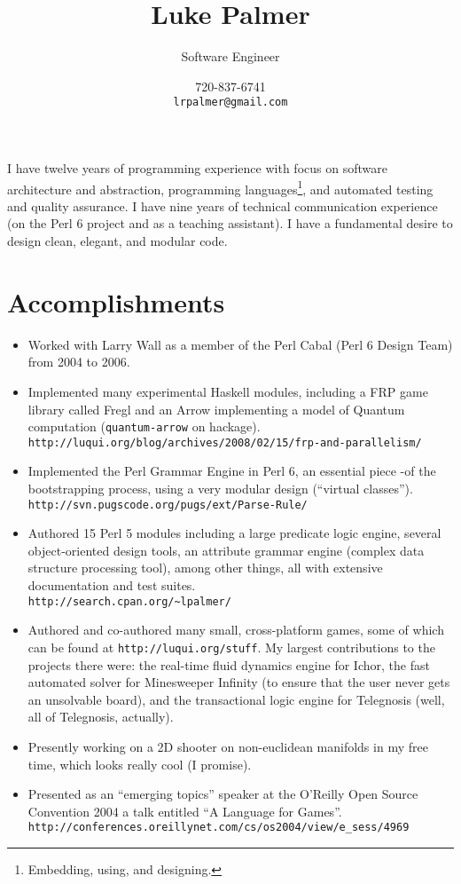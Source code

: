 \documentclass[12pt]{article}
\title{Luke Palmer}
\author{Software Engineer}
\date{720-837-6741 \\ \texttt{lrpalmer@gmail.com}}
\begin{document}
\maketitle

I have twelve years of programming experience with focus on software
architecture and abstraction, programming languages\footnote{Embedding,
using, and designing.}, and automated testing and quality assurance.  I
have nine years of technical communication experience (on the Perl 6
project and as a teaching assistant). I have a fundamental desire to
design clean, elegant, and modular code.

\section*{Accomplishments}

\begin{itemize}
\item Worked with Larry Wall as a member of the Perl Cabal (Perl 6
Design Team) from 2004 to 2006.
\item Implemented many experimental Haskell modules, including a FRP
game library called Fregl and an Arrow implementing a model of Quantum
computation (\texttt{quantum-arrow} on hackage). \\
\verb|http://luqui.org/blog/archives/2008/02/15/frp-and-parallelism/| \\
\item Implemented the Perl Grammar Engine in Perl 6, an essential piece
-of the bootstrapping process, using a very modular design (``virtual
classes''). \\
\verb|http://svn.pugscode.org/pugs/ext/Parse-Rule/|
\item Authored 15 Perl 5 modules including a large predicate logic
engine, several object-oriented design tools, an attribute grammar
engine (complex data structure processing tool), among other things, all
with extensive documentation and test suites. \\
\verb|http://search.cpan.org/~lpalmer/|
\item Authored and co-authored many small, cross-platform games, some of
which can be found at \verb|http://luqui.org/stuff|.  My largest
contributions to the projects there were: the real-time fluid dynamics
engine for Ichor, the fast automated solver for Minesweeper Infinity (to
ensure that the user never gets an unsolvable board), and the
transactional logic engine for Telegnosis (well, all of Telegnosis,
actually).
\item Presently working on a 2D shooter on non-euclidean manifolds in my
free time, which looks really cool (I promise).
\item Presented as an ``emerging topics'' speaker at the O'Reilly Open
Source Convention 2004 a talk entitled ``A Language for Games''.  \\
\verb|http://conferences.oreillynet.com/cs/os2004/view/e_sess/4969|
\end{itemize}
\end{document}
